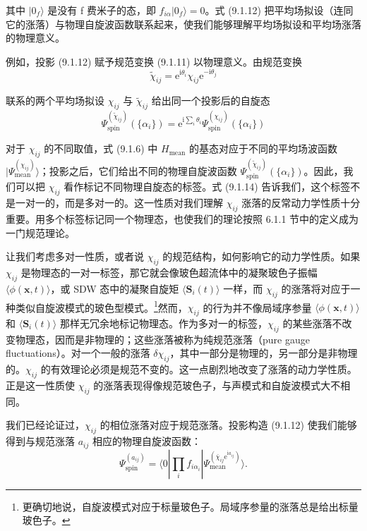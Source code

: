 其中 $|0_f\rangle$ 是没有 f 费米子的态，即 $f_{i\alpha}|0_f\rangle=0$。式 (9.1.12) 把平均场拟设（连同它的涨落）与物理自旋波函数联系起来，使我们能够理解平均场拟设和平均场涨落的物理意义。

例如，投影 (9.1.12) 赋予规范变换 (9.1.11) 以物理意义。由规范变换
\begin{equation*}
\tilde{\chi}_{ij}=\mathrm{e}^{\mathrm{i}\theta_i}\chi_{ij}\mathrm{e}^{-\mathrm{i}\theta_j}
\tag{9.1.13}
\end{equation*}

联系的两个平均场拟设 $\chi_{ij}$ 与 $\tilde{\chi}_{ij}$ 给出同一个投影后的自旋态
\begin{equation*}
\Psi^{(\tilde{\chi}_{ij})}_{\text{spin}}(\{\alpha_i\})=\mathrm{e}^{\mathrm{i}\sum_i\theta_i}\Psi^{(\chi_{ij})}_{\text{spin}}(\{\alpha_i\})
\tag{9.1.14}
\end{equation*}

对于 $\chi_{ij}$ 的不同取值，式 (9.1.6) 中 $H_{\text{mean}}$ 的基态对应于不同的平均场波函数 $|\Psi^{(\chi_{ij})}_{\text{mean}}\rangle$；投影之后，它们给出不同的物理自旋波函数 $\Psi^{(\tilde{\chi}_{ij})}_{\text{spin}}(\{\alpha_i\})$。因此，我们可以把 $\chi_{ij}$ 看作标记不同物理自旋态的标签。式 (9.1.14) 告诉我们，这个标签不是一对一的，而是多对一的。这一性质对我们理解 $\chi_{ij}$ 涨落的反常动力学性质十分重要。用多个标签标记同一个物理态，也使我们的理论按照 6.1.1 节中的定义成为一门规范理论。

让我们考虑多对一性质，或者说 $\chi_{ij}$ 的规范结构，如何影响它的动力学性质。如果 $\chi_{ij}$ 是物理态的一对一标签，那它就会像玻色超流体中的凝聚玻色子振幅 $\langle\phi(\pmb{x},t)\rangle$，或 SDW 态中的凝聚自旋矩 $\langle\pmb{S}_i(t)\rangle$ 一样，而 $\chi_{ij}$ 的涨落将对应于一种类似自旋波模式的玻色型模式。\footnote{更确切地说，自旋波模式对应于标量玻色子。局域序参量的涨落总是给出标量玻色子。}然而，$\chi_{ij}$ 的行为并不像局域序参量 $\langle\phi(\pmb{x},t)\rangle$ 和 $\langle\pmb{S}_i(t)\rangle$ 那样无冗余地标记物理态。作为多对一的标签，$\chi_{ij}$ 的某些涨落不改变物理态，因而是非物理的；这些涨落被称为纯规范涨落（pure gauge fluctuations）。对一个一般的涨落 $\delta\chi_{ij}$，其中一部分是物理的，另一部分是非物理的。$\chi_{ij}$ 的有效理论必须是规范不变的。这一点剧烈地改变了涨落的动力学性质。正是这一性质使 $\chi_{ij}$ 的涨落表现得像规范玻色子，与声模式和自旋波模式大不相同。

我们已经论证过，$\chi_{ij}$ 的相位涨落对应于规范涨落。投影构造 (9.1.12) 使我们能够得到与规范涨落 $a_{ij}$ 相应的物理自旋波函数：
\begin{equation*}
\Psi^{(a_{ij})}_{\text{spin}}=\langle 0|\prod_{i}f_{i\alpha_i}|\Psi^{(\bar{\chi}_{ij}\mathrm{e}^{\mathrm{i}a_{ij}})}_{\text{mean}}\rangle.
\end{equation*}

